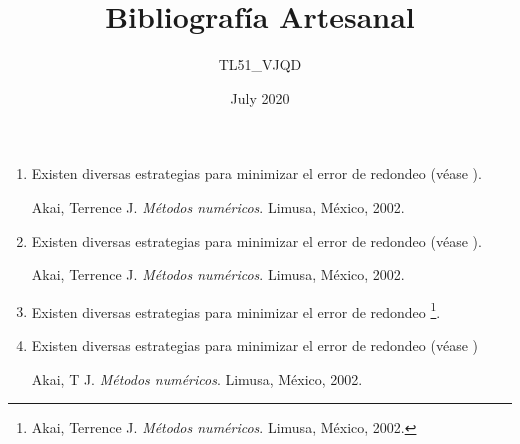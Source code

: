 \documentclass[12pt]{article}
\title{\textbf{Bibliografía Artesanal}}
\author{TL51\_VJQD}
\date{July 2020}
\begin{document}
\maketitle
\begin{enumerate}
    \item Existen diversas estrategias para minimizar el error de redondeo (véase \cite{Akai}).
        \begin{thebibliography}{XXX99}
            Akai, Terrence J. \emph{Métodos numéricos}. Limusa, México, 2002.
        \end{thebibliography}
    \item Existen diversas estrategias para minimizar el error de redondeo (véase \cite{Akai2}).
        \begin{thebibliography}{XXX99}
            Akai, Terrence J. \emph{Métodos numéricos}. Limusa, México, 2002. 
        \end{thebibliography}
    \item Existen diversas estrategias para minimizar el error de redondeo \footnote{
            Akai, Terrence J. \emph{Métodos numéricos}. Limusa, México, 2002.}.
    \item Existen diversas estrategias para minimizar el error de redondeo (véase \cite{Akai4})
        \begin{thebibliography}{99}
            Akai, T J. \emph{Métodos numéricos}. Limusa, México, 2002. 
        \end{thebibliography}
\end{enumerate}
\end{document}
